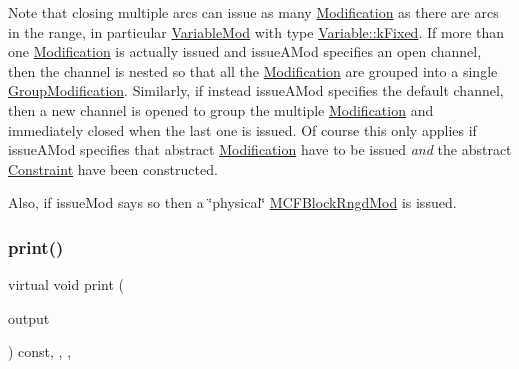 Note that closing multiple arcs can issue as many \mbox{\hyperlink{class_s_m_spp__di__unipi__it_1_1_modification}{Modification}} as there are arcs in the range, in particular \mbox{\hyperlink{class_s_m_spp__di__unipi__it_1_1_variable_mod}{Variable\+Mod}} with type \mbox{\hyperlink{class_s_m_spp__di__unipi__it_1_1_variable_a30febf04ce89c19659143fa83ae6f7baaf0cb52fcb65ba1ee2e93ef655d5c7693}{Variable\+::k\+Fixed}}. If more than one \mbox{\hyperlink{class_s_m_spp__di__unipi__it_1_1_modification}{Modification}} is actually issued and issue\+A\+Mod specifies an open channel, then the channel is nested so that all the \mbox{\hyperlink{class_s_m_spp__di__unipi__it_1_1_modification}{Modification}} are grouped into a single \mbox{\hyperlink{class_s_m_spp__di__unipi__it_1_1_group_modification}{Group\+Modification}}. Similarly, if instead issue\+A\+Mod specifies the default channel, then a new channel is opened to group the multiple \mbox{\hyperlink{class_s_m_spp__di__unipi__it_1_1_modification}{Modification}} and immediately closed when the last one is issued. Of course this only applies if issue\+A\+Mod specifies that abstract \mbox{\hyperlink{class_s_m_spp__di__unipi__it_1_1_modification}{Modification}} have to be issued {\itshape and} the abstract \mbox{\hyperlink{class_s_m_spp__di__unipi__it_1_1_constraint}{Constraint}} have been constructed.

Also, if issue\+Mod says so then a \char`\"{}physical\char`\"{} \mbox{\hyperlink{class_s_m_spp__di__unipi__it_1_1_m_c_f_block_rngd_mod}{M\+C\+F\+Block\+Rngd\+Mod}} is issued. \mbox{\label{class_s_m_spp__di__unipi__it_1_1_m_c_f_block_a617885c1d228e0ca67bbb0efdbe713e3}} 
\subsubsection{\texorpdfstring{print()}{print()}}
{\footnotesize\ttfamily virtual void print (\begin{DoxyParamCaption}\item[{std\+::ostream \&}]{output }\end{DoxyParamCaption}) const\hspace{0.3cm}{\ttfamily [final]}, {\ttfamily [override]}, {\ttfamily [protected]}, {\ttfamily [virtual]}}



